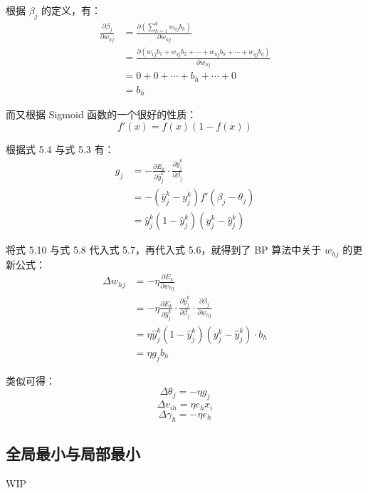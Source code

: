 \documentclass[../studies-ml.tex]{subfiles}
\begin{document}
根据 $\beta_j$ 的定义，有：
\begin{equation}
  \begin{split}
    \frac{\partial \beta_j}{\partial w_{hj}} & = \frac{\partial (\sum_{h=1}^{q} w_{hj} b_h) }{\partial w_{hj}} \\
    & = \frac{\partial (w_{1j}b_1 + w_{2j}b_2 + \cdots + w_{hj}b_h + \cdots + w_{qj}b_q)}{\partial w_{hj}} \\
    & = 0 + 0 + \cdots + b_h + \cdots + 0 \\
    & = b_h
  \end{split}
\end{equation}

而又根据 Sigmoid 函数的一个很好的性质：
\begin{equation}
  f'(x) = f(x)(1 - f(x))
\end{equation}

根据式 5.4 与式 5.3 有：
\begin{equation}
  \begin{split}
    g_j & = -\frac{\partial E_k}{\partial \hat{y}_j^k} \cdot \frac{\partial \hat{y}_j^k}{\partial \beta_j} \\
    & = -(\hat{y}_j^k - y_j^k)f'(\beta_j - \theta_j) \\
    & = \hat{y}_j^k (1 - \hat{y}_j^k)(y_j^k - \hat{y}_j^k)
  \end{split}
\end{equation}

将式 5.10 与式 5.8 代入式 5.7，再代入式 5.6，就得到了 BP 算法中关于 $w_{hj}$ 的更新公式：
\begin{equation}
  \begin{split}
    \Delta w_{hj} & = -\eta \frac{\partial E_k}{\partial w_{hj}} \\
    & = -\eta \frac{\partial E_k}{\partial \hat{y}_j^k} \cdot
    \frac{\partial \hat{y}_j^k}{\partial \beta_j} \cdot
    \frac{\partial \beta_j}{\partial w_{hj}} \\
    & = \eta \hat{y}_j^k (1 - \hat{y}_j^k)(y_j^k - \hat{y}_j^k) \cdot b_h \\
    & = \eta g_j b_h
  \end{split}
\end{equation}

类似可得：
\begin{equation}
  \Delta \theta_j = -\eta g_j
\end{equation}
\begin{equation}
  \Delta v_{ih} = \eta e_h x_i
\end{equation}
\begin{equation}
  \Delta \gamma_h = -\eta e_h
\end{equation}


\subsection{全局最小与局部最小}

WIP
\end{document}

